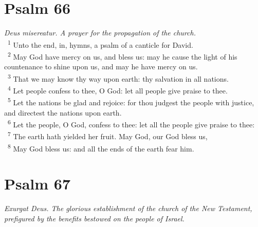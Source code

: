 \documentclass[a5paper,12pt]{article}
\begin{document}
\begin{multicols*}{2}
\section{Psalm 66}
\label{sec:org457b395}
\emph{Deus misereatur. A prayer for the propagation of the church.}\\

~\textsuperscript{1} Unto the end, in, hymns, a psalm of a canticle for David.\\
~\textsuperscript{2} May God have mercy on us, and bless us: may he cause the light of his countenance to shine upon us, and may he have mercy on us.\\
~\textsuperscript{3} That we may know thy way upon earth: thy salvation in all nations.\\
~\textsuperscript{4} Let people confess to thee, O God: let all people give praise to thee.\\
~\textsuperscript{5} Let the nations be glad and rejoice: for thou judgest the people with justice, and directest the nations upon earth.\\
~\textsuperscript{6} Let the people, O God, confess to thee: let all the people give praise to thee:\\
~\textsuperscript{7} The earth hath yielded her fruit. May God, our God bless us,\\
~\textsuperscript{8} May God bless us: and all the ends of the earth fear him.\\

\section{Psalm 67}
\label{sec:org3acb194}
\emph{Exurgat Deus. The glorious establishment of the church of the New Testament, prefigured by the benefits bestowed on the people of Israel.}\\


\end{multicols*}
\end{document}
